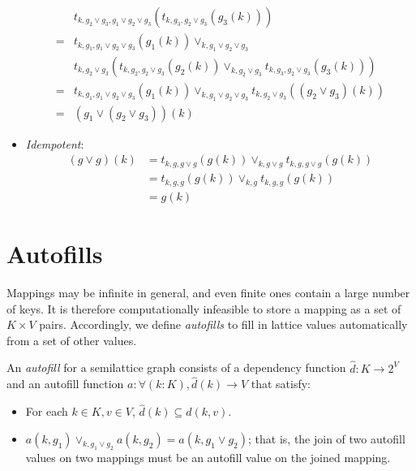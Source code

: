\documentclass{article}
\begin{document}
\begin{itemize}
\begin{align*}
               & t_{k, g_2 \vee g_3, g_1 \vee g_2 \vee g_3}(t_{k, g_3, g_2 \vee g_3}(g_3(k))) \\
              =& t_{k, g_1, g_1 \vee g_2 \vee g_3}(g_1(k)) \vee_{k, g_1 \vee g_2 \vee g_3} \\
               & t_{k, g_2 \vee g_3}(t_{k, g_2, g_2 \vee g_3}(g_2(k)) \vee_{k, g_2 \vee g_3} t_{k, g_3, g_2 \vee g_3}(g_3(k))) \\
              =& t_{k, g_1, g_1 \vee g_2 \vee g_3}(g_1(k)) \vee_{k, g_1 \vee g_2 \vee g_3} t_{k, g_2 \vee g_3}((g_2 \vee g_3)(k)) \\
              =& (g_1 \vee (g_2 \vee g_3))(k)
            \end{align*}
          \item \emph{Idempotent}:
            \begin{align*}
              (g \vee g)(k) &= t_{k, g, g \vee g}(g(k)) \vee_{k, g \vee g} t_{k, g, g \vee g}(g(k)) \\
              &= t_{k, g, g}(g(k)) \vee_{k, g} t_{k, g, g}(g(k)) \\
              &= g(k)
            \end{align*}
        \end{itemize}

    \section{Autofills}

        Mappings may be infinite in general, and even finite ones contain a large number of keys. It is therefore computationally infeasible to store a mapping as a set of $K \times V$ pairs. Accordingly, we define \emph{autofills} to fill in lattice values automatically from a set of other values.




        An \emph{autofill} for a semilattice graph consists of a dependency function $\hat{d}: K \rightarrow 2^V$ and an autofill function $a : \forall (k:K), \hat{d}(k) \rightarrow V$ that satisfy:

        \begin{itemize}
          \item
            For each $k \in K, v \in V$, $\hat{d}(k) \subseteq d(k, v)$.
          \item
            $a(k, g_1) \vee_{k, g_1 \vee g_2} a(k, g_2) = a(k, g_1 \vee g_2)$; that is, the join of two autofill values on two mappings must be an autofill value on the joined mapping.
        \end{itemize}
\end{document}
